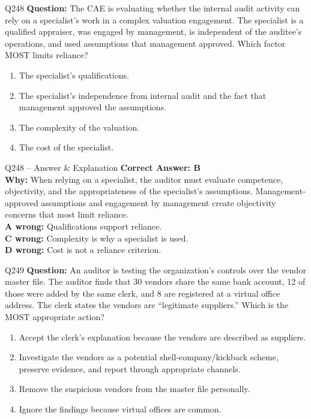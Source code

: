 \documentclass[aspectratio=169,10pt]{beamer}
\begin{document}
	\begin{frame}[t]{Q248}
		\small
		\textbf{Question:} The CAE is evaluating whether the internal audit activity can rely on a specialist's work in a complex valuation engagement. The specialist is a qualified appraiser, was engaged by management, is independent of the auditee's operations, and used assumptions that management approved. Which factor MOST limits reliance?
		\begin{enumerate}[label=\Alph*.,itemsep=1pt,topsep=2pt]
			\item The specialist's qualifications.
			\item The specialist's independence from internal audit and the fact that management approved the assumptions.
			\item The complexity of the valuation.
			\item The cost of the specialist.
		\end{enumerate}
	\end{frame}
	
	\begin{frame}[t]{Q248 -- Answer \& Explanation}
		\small
		\textbf{Correct Answer: B} \\[4pt]
		\textbf{Why:} When relying on a specialist, the auditor must evaluate competence, objectivity, and the appropriateness of the specialist's assumptions. Management-approved assumptions and engagement by management create objectivity concerns that most limit reliance. \\[4pt]
		\textbf{A wrong:} Qualifications support reliance. \\[2pt]
		\textbf{C wrong:} Complexity is why a specialist is used. \\[2pt]
		\textbf{D wrong:} Cost is not a reliance criterion.
	\end{frame}
	
	\begin{frame}[t]{Q249}
		\small
		\textbf{Question:} An auditor is testing the organization's controls over the vendor master file. The auditor finds that 30 vendors share the same bank account, 12 of those were added by the same clerk, and 8 are registered at a virtual office address. The clerk states the vendors are ``legitimate suppliers.'' Which is the MOST appropriate action?
		\begin{enumerate}[label=\Alph*.,itemsep=1pt,topsep=2pt]
			\item Accept the clerk's explanation because the vendors are described as suppliers.
			\item Investigate the vendors as a potential shell-company/kickback scheme, preserve evidence, and report through appropriate channels.
			\item Remove the suspicious vendors from the master file personally.
			\item Ignore the findings because virtual offices are common.
		\end{enumerate}
	\end{frame}
	
\end{document}
